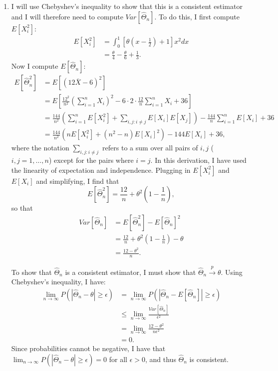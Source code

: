 \begin{problem}{3}
\begin{enumerate}
\item I will use Chebyshev's inequality to show that this is a consistent estimator and I will therefore need to compute $Var[\hat \Theta_n]$.  To do this, I first compute $E[X_i^2]$:
\begin{align*}
E[X_i^2] &= \int_0^1\left[ \theta \left (x-\frac{1}{2} \right)+1\right]x^2 dx \\
& = \frac{\theta}{4}- \frac{\theta}{6}+\frac{1}{3}.
\end{align*}
Now I compute $E[\hat \Theta_n]$:
\begin{align*}
E[\hat \Theta_n^2] &= E\left[(12 \bar X - 6)^2 \right] \\ 
&= E\left[\frac{12^2}{n^2} \left(\sum_{i=1}^n X_i \right)^2 -6\cdot 2\cdot \frac{12}{n} \sum_{i=1}^n X_i +36 \right] \\ 
&= \frac{144}{n^2} \left(\sum_{i=1}^n E[X_i^2] + \sum_{i, j: i \neq j} E[X_i]E[X_j] \right)-\frac{144}{n}\sum_{i=1}^n E[X_i] +36 \\
&= \frac{144}{n^2} \left(n E[X_i^2] + (n^2-n) E[X_i]^2 \right)-144 E[X_i] +36,
\end{align*}
where the notation $\sum_{i, j: i \neq j}$ refers to a sum over all pairs of $i, j$ ($i, j = 1, \ldots, n$) except for the pairs where $i=j$.   In this derivation, I have used the linearity of expectation and independence.  Plugging in $E[X_i^2]$ and $E[X_i]$ and simplifying, I find that 
\begin{equation*}
E[\hat \Theta_n^2]  = \frac{12}{n}+ \theta^2\left (1-\frac{1}{n} \right),
\end{equation*}
so that 
\begin{align*}
Var[\hat \Theta_n] &= E[\hat \Theta_n^2]-E[\hat \Theta_n]^2 \\
& = \frac{12}{n}+ \theta^2\left (1-\frac{1}{n} \right) - \theta \\
& = \frac{12-\theta^2}{n}.
\end{align*}

To show that $\hat \Theta_n$ is a consistent estimator, I must show that $\hat \Theta_n \xrightarrow{p} \theta$.  Using Chebyshev's inequality, I have:
\begin{align*}
\lim_{n \rightarrow \infty} P(|\hat \Theta_n - \theta| \ge \epsilon)&= \lim_{n \rightarrow \infty} P(|\hat \Theta_n - E[\hat \Theta_n]| \ge \epsilon) \\
& \le \lim_{n \rightarrow \infty}  \frac{Var[\hat \Theta_n]}{\epsilon^2} \\
& =  \lim_{n \rightarrow \infty}\frac{12-\theta^2}{n \epsilon^2} \\
& = 0.
\end{align*}
Since probabilities cannot be negative, I have that $\lim_{n \rightarrow \infty} P(|\hat \Theta_n - \theta| \ge \epsilon) = 0$ for all $\epsilon >0$, and thus $\hat \Theta_n$ is consistent.


\end{enumerate}
\end{problem}
